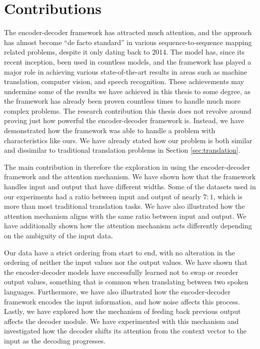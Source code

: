 
\section{Contributions}
\label{sec:contributions_final}
The encoder-decoder framework has attracted much attention, and the approach has almost become ``de facto standard'' in various sequence-to-sequence mapping related problems, despite it only dating back to 2014. The model has, since its recent inception, been used in countless models, and the framework has played a major role in achieving various state-of-the-art results in areas such as machine translation, computer vision, and speech recognition. These achievements may undermine some of the results we have achieved in this thesis to some degree, as the framework has already been proven countless times to handle much more complex problems. The research contribution this thesis does not revolve around proving just how powerful the encoder-decoder framework is. Instead, we have demonstrated how the framework was able to handle a problem with characteristics like ours. We have already stated how our problem is both similar and dissimilar to traditional translation problems in Section \ref{sec:translation}.

The main contribution in therefore the exploration in using the encoder-decoder framework and the attention mechanism. We have shown how that the framework handles input and output that have different widths. Some of the datasets used in our experiments had a ratio between input and output of nearly \(7 : 1\), which is more than most traditional translation tasks. We have also illustrated how the attention mechanism aligns with the same ratio between input and output. We have additionally shown how the attention mechanism acts differently depending on the ambiguity of the input data.

Our data have a strict ordering from start to end, with no alteration in the ordering of neither the input values nor the output values. We have shown that the encoder-decoder models have successfully learned not to swap or reorder output values, something that is common when translating between two spoken languages. Furthermore, we have also illustrated how the encoder-decoder framework encodes the input information, and how noise affects this process. Lastly, we have explored how the mechanism of feeding back previous output affects the decoder module. We have experimented with this mechanism and investigated how the decoder shifts its attention from the context vector to the input as the decoding progresses.

